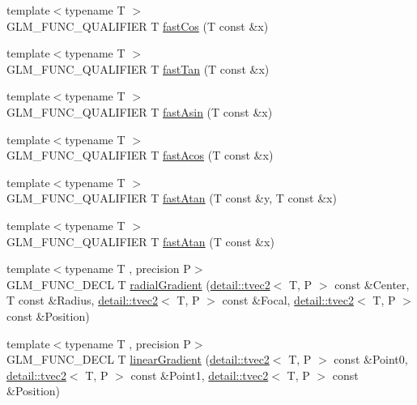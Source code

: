 \begin{DoxyCompactItemize}
\item 
{\footnotesize template$<$typename T $>$ }\\G\-L\-M\-\_\-\-F\-U\-N\-C\-\_\-\-Q\-U\-A\-L\-I\-F\-I\-E\-R T \hyperlink{group__gtx__fast__trigonometry_gad54184beaba79e41db71a1f5711380c4}{fast\-Cos} (T const \&x)
\item 
{\footnotesize template$<$typename T $>$ }\\G\-L\-M\-\_\-\-F\-U\-N\-C\-\_\-\-Q\-U\-A\-L\-I\-F\-I\-E\-R T \hyperlink{group__gtx__fast__trigonometry_gae6615cdb40d8dc58115a07a21f495561}{fast\-Tan} (T const \&x)
\item 
{\footnotesize template$<$typename T $>$ }\\G\-L\-M\-\_\-\-F\-U\-N\-C\-\_\-\-Q\-U\-A\-L\-I\-F\-I\-E\-R T \hyperlink{group__gtx__fast__trigonometry_gab8595a77c5b215b95f662238dc3ff722}{fast\-Asin} (T const \&x)
\item 
{\footnotesize template$<$typename T $>$ }\\G\-L\-M\-\_\-\-F\-U\-N\-C\-\_\-\-Q\-U\-A\-L\-I\-F\-I\-E\-R T \hyperlink{group__gtx__fast__trigonometry_ga44e6efc3e776a51645fdf998e3e4f11b}{fast\-Acos} (T const \&x)
\item 
{\footnotesize template$<$typename T $>$ }\\G\-L\-M\-\_\-\-F\-U\-N\-C\-\_\-\-Q\-U\-A\-L\-I\-F\-I\-E\-R T \hyperlink{group__gtx__fast__trigonometry_gaf6234384b94846e29cf2c51dc245d484}{fast\-Atan} (T const \&y, T const \&x)
\item 
{\footnotesize template$<$typename T $>$ }\\G\-L\-M\-\_\-\-F\-U\-N\-C\-\_\-\-Q\-U\-A\-L\-I\-F\-I\-E\-R T \hyperlink{group__gtx__fast__trigonometry_ga49b3b2b777b83eeed3e11205e800027e}{fast\-Atan} (T const \&x)
\item 
{\footnotesize template$<$typename T , precision P$>$ }\\G\-L\-M\-\_\-\-F\-U\-N\-C\-\_\-\-D\-E\-C\-L T \hyperlink{group__gtx__gradient__paint_ga864c46234e363137b717119231f422f6}{radial\-Gradient} (\hyperlink{structglm_1_1detail_1_1tvec2}{detail\-::tvec2}$<$ T, P $>$ const \&Center, T const \&Radius, \hyperlink{structglm_1_1detail_1_1tvec2}{detail\-::tvec2}$<$ T, P $>$ const \&Focal, \hyperlink{structglm_1_1detail_1_1tvec2}{detail\-::tvec2}$<$ T, P $>$ const \&Position)
\item 
{\footnotesize template$<$typename T , precision P$>$ }\\G\-L\-M\-\_\-\-F\-U\-N\-C\-\_\-\-D\-E\-C\-L T \hyperlink{group__gtx__gradient__paint_ga01eb377864e98f86bd44378e1b86eb22}{linear\-Gradient} (\hyperlink{structglm_1_1detail_1_1tvec2}{detail\-::tvec2}$<$ T, P $>$ const \&Point0, \hyperlink{structglm_1_1detail_1_1tvec2}{detail\-::tvec2}$<$ T, P $>$ const \&Point1, \hyperlink{structglm_1_1detail_1_1tvec2}{detail\-::tvec2}$<$ T, P $>$ const \&Position)

\end{DoxyCompactItemize}
